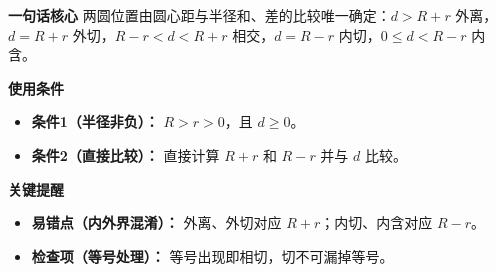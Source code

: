 \begin{summarybox}
	\textbf{\textcolor{CSummary}{一句话核心}}
	两圆位置由圆心距与半径和、差的比较唯一确定：$d > R+r$ 外离，$d = R+r$ 外切，$R-r < d < R+r$ 相交，$d = R-r$ 内切，$0\le d<R-r$ 内含。

	\medskip
	\textbf{\textcolor{CSummary}{使用条件}}
	\begin{itemize}[leftmargin=*, itemsep=0.5em, topsep=0.4em]
		\item \textbf{条件1（半径非负）：} $R>r>0$，且 $d\ge 0$。
		\item \textbf{条件2（直接比较）：} 直接计算 $R+r$ 和 $R-r$ 并与 $d$ 比较。
	\end{itemize}

	\medskip
	\textbf{\textcolor{CSummary}{关键提醒}}
	\begin{itemize}[leftmargin=*, itemsep=0.5em, topsep=0.4em]
		\item \textbf{易错点（内外界混淆）：} 外离、外切对应 $R+r$；内切、内含对应 $R-r$。
		\item \textbf{检查项（等号处理）：} 等号出现即相切，切不可漏掉等号。
	\end{itemize}

\end{summarybox}
